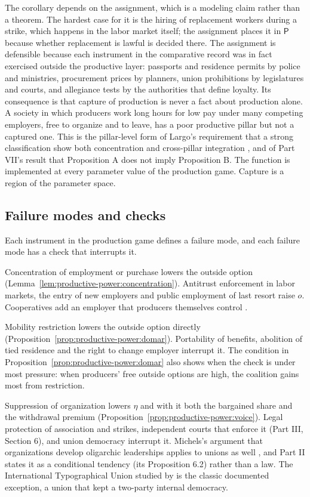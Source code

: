 \documentclass[11pt,letterpaper]{article}
\theoremstyle{definition}
\theoremstyle{remark}
\newcommand{\pP}{\mathsf{P}}
\begin{document}
The corollary depends on the assignment, which is a modeling claim rather than a theorem. The hardest case for it is the hiring of replacement workers during a strike, which happens in the labor market itself; the assignment places it in $\pP$ because whether replacement is lawful is decided there. The assignment is defensible because each instrument in the comparative record was in fact exercised outside the productive layer: passports and residence permits by police and ministries, procurement prices by planners, union prohibitions by legislatures and courts, and allegiance tests by the authorities that define loyalty. Its consequence is that capture of production is never a fact about production alone. A society in which producers work long hours for low pay under many competing employers, free to organize and to leave, has a poor productive pillar but not a captured one. This is the pillar-level form of Largo's requirement that a strong classification show both concentration and cross-pillar integration \citep{largo2026hbs}, and of Part VII's result that Proposition A does not imply Proposition B. The function is implemented at every parameter value of the production game. Capture is a region of the parameter space.

\subsection{Failure modes and checks}

Each instrument in the production game defines a failure mode, and each failure mode has a check that interrupts it.

Concentration of employment or purchase lowers the outside option (Lemma~\ref{lem:productive-power:concentration}). Antitrust enforcement in labor markets, the entry of new employers and public employment of last resort raise $o$. Cooperatives add an employer that producers themselves control \citep{dow2003}.

Mobility restriction lowers the outside option directly (Proposition~\ref{prop:productive-power:domar}). Portability of benefits, abolition of tied residence and the right to change employer interrupt it. The condition in Proposition~\ref{prop:productive-power:domar} also shows when the check is under most pressure: when producers' free outside options are high, the coalition gains most from restriction.

Suppression of organization lowers $\eta$ and with it both the bargained share and the withdrawal premium (Proposition~\ref{prop:productive-power:voice}). Legal protection of association and strikes, independent courts that enforce it (Part III, Section 6), and union democracy interrupt it. Michels's argument that organizations develop oligarchic leaderships applies to unions as well \citep{michels1915}, and Part II states it as a conditional tendency (its Proposition 6.2) rather than a law. The International Typographical Union studied by \citet{lipset1956} is the classic documented exception, a union that kept a two-party internal democracy.
\end{document}
